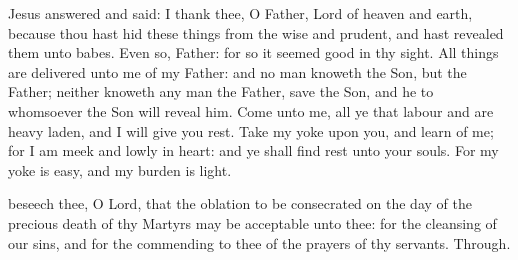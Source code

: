 
\alleluianotice\label{PrimusFelicianGreaterAlleluia}


 Jesus answered and said: I thank thee, O Father, Lord of heaven and earth, because thou hast hid these things from the wise and prudent, and hast revealed them unto babes. Even so, Father: for so it seemed good in thy sight. All things are delivered unto me of my Father: and no man knoweth the Son, but the Father; neither knoweth any man the Father, save the Son, and he to whomsoever the Son will reveal him. Come unto me, all ye that labour and are heavy laden, and I will give you rest. Take my yoke upon you, and learn of me; for I am meek and lowly in heart: and ye shall find rest unto your souls. For my yoke is easy, and my burden is light.


\vspace{-0.25\baselineskip}

\secret

\vspace{-0.1\baselineskip}

 beseech thee, O Lord, that the oblation to be consecrated on the day of the precious death of thy Martyrs may be acceptable unto thee: for the cleansing of our sins, and for the commending to thee of the prayers of thy servants. Through.


\vspace{-0.25\baselineskip}

